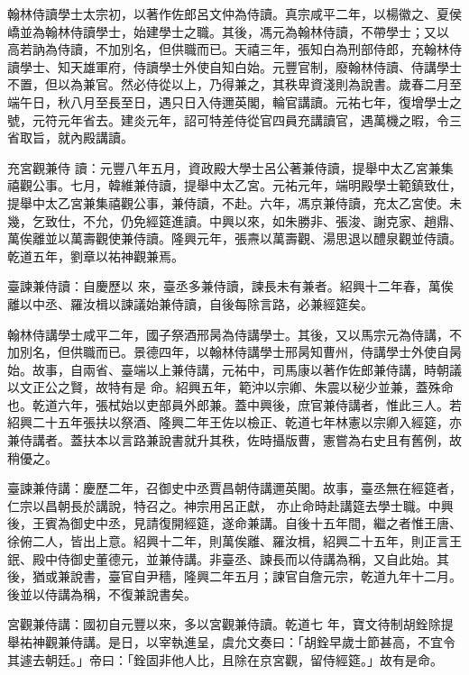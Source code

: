 \begin{pinyinscope}
 翰林侍讀學士太宗初，以著作佐郎呂文仲為侍讀。真宗咸平二年，以楊徽之、夏侯嶠並為翰林侍讀學士，始建學士之職。其後，馮元為翰林侍讀，不帶學士；又以
 高若訥為侍讀，不加別名，但供職而已。天禧三年，張知白為刑部侍郎，充翰林侍讀學士、知天雄軍府，侍讀學士外使自知白始。元豐官制，廢翰林侍讀、侍講學士不置，但以為兼官。然必侍從以上，乃得兼之，其秩卑資淺則為說書。歲春二月至端午日，秋八月至長至日，遇只日入侍邇英閣，輪官講讀。元祐七年，復增學士之號，元符元年省去。建炎元年，詔可特差侍從官四員充講讀官，遇萬機之暇，令三省取旨，就內殿講讀。



 充宮觀兼侍
 讀：元豐八年五月，資政殿大學士呂公著兼侍讀，提舉中太乙宮兼集禧觀公事。七月，韓維兼侍讀，提舉中太乙宮。元祐元年，端明殿學士範鎮致仕，提舉中太乙宮兼集禧觀公事，兼侍讀，不赴。六年，馮京兼侍讀，充太乙宮使。未幾，乞致仕，不允，仍免經筵進讀。中興以來，如朱勝非、張浚、謝克家、趙鼎、萬俟離並以萬壽觀使兼侍讀。隆興元年，張燾以萬壽觀、湯思退以醴泉觀並侍讀。乾道五年，劉章以祐神觀兼焉。



 臺諫兼侍讀：自慶歷以
 來，臺丞多兼侍讀，諫長未有兼者。紹興十二年春，萬俟離以中丞、羅汝楫以諫議始兼侍讀，自後每除言路，必兼經筵矣。



 翰林侍講學士咸平二年，國子祭酒邢昺為侍講學士。其後，又以馬宗元為侍講，不加別名，但供職而已。景德四年，以翰林侍講學士邢昺知曹州，侍講學士外使自昺始。故事，自兩省、臺端以上兼侍講，元祐中，司馬康以著作佐郎兼侍講，時朝議以文正公之賢，故特有是
 命。紹興五年，範沖以宗卿、朱震以秘少並兼，蓋殊命也。乾道六年，張栻始以吏部員外郎兼。蓋中興後，庶官兼侍講者，惟此三人。若紹興二十五年張扶以祭酒、隆興二年王佐以檢正、乾道七年林憲以宗卿入經筵，亦兼侍講者。蓋扶本以言路兼說書就升其秩，佐時攝版曹，憲嘗為右史且有舊例，故稍優之。



 臺諫兼侍講：慶歷二年，召御史中丞賈昌朝侍講邇英閣。故事，臺丞無在經筵者，仁宗以昌朝長於講說，特召之。神宗用呂正獻，
 亦止命時赴講筵去學士職。中興後，王賓為御史中丞，見請復開經筵，遂命兼講。自後十五年間，繼之者惟王唐、徐俯二人，皆出上意。紹興十二年，則萬俟離、羅汝楫，紹興二十五年，則正言王鈱、殿中侍御史董德元，並兼侍講。非臺丞、諫長而以侍講為稱，又自此始。其後，猶或兼說書，臺官自尹穡，隆興二年五月；諫官自詹元宗，乾道九年十二月。後並以侍講為稱，不復兼說書矣。



 宮觀兼侍講：國初自元豐以來，多以宮觀兼侍讀。乾道七
 年，寶文待制胡銓除提舉祐神觀兼侍講。是日，以宰執進呈，虞允文奏曰：「胡銓早歲士節甚高，不宜令其遽去朝廷。」帝曰：「銓固非他人比，且除在京宮觀，留侍經筵。」故有是命。




\end{pinyinscope}
